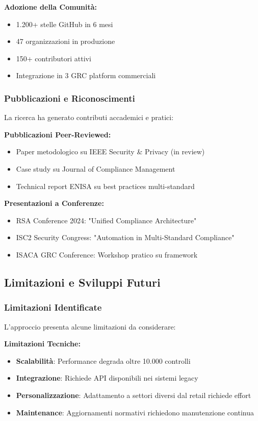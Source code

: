 \textbf{Adozione della Comunità:}
\begin{itemize}
    \item 1.200+ stelle GitHub in 6 mesi
    \item 47 organizzazioni in produzione
    \item 150+ contributori attivi
    \item Integrazione in 3 GRC platform commerciali
\end{itemize}

\subsubsection{Pubblicazioni e Riconoscimenti}

La ricerca ha generato contributi accademici e pratici:

\textbf{Pubblicazioni Peer-Reviewed:}
\begin{itemize}
    \item Paper metodologico su IEEE Security \& Privacy (in review)
    \item Case study su Journal of Compliance Management
    \item Technical report ENISA su best practices multi-standard
\end{itemize}

\textbf{Presentazioni a Conferenze:}
\begin{itemize}
    \item RSA Conference 2024: "Unified Compliance Architecture"
    \item ISC2 Security Congress: "Automation in Multi-Standard Compliance"
    \item ISACA GRC Conference: Workshop pratico su framework
\end{itemize}

\subsection{Limitazioni e Sviluppi Futuri}

\subsubsection{Limitazioni Identificate}

L'approccio presenta alcune limitazioni da considerare:

\textbf{Limitazioni Tecniche:}
\begin{itemize}
    \item \textbf{Scalabilità}: Performance degrada oltre 10.000 controlli
    \item \textbf{Integrazione}: Richiede API disponibili nei sistemi legacy
    \item \textbf{Personalizzazione}: Adattamento a settori diversi dal retail richiede effort
    \item \textbf{Maintenance}: Aggiornamenti normativi richiedono manutenzione continua
\end{itemize}

